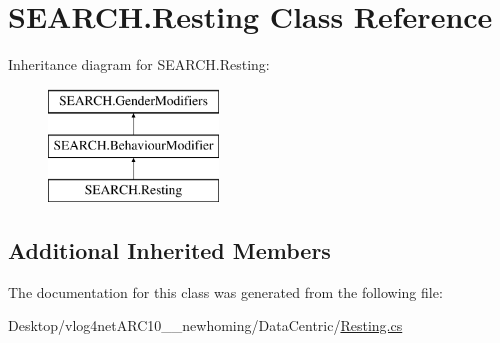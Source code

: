 \hypertarget{class_s_e_a_r_c_h_1_1_resting}{\section{S\-E\-A\-R\-C\-H.\-Resting Class Reference}
\label{class_s_e_a_r_c_h_1_1_resting}
}
Inheritance diagram for S\-E\-A\-R\-C\-H.\-Resting\-:\begin{figure}[H]
\begin{center}
\leavevmode
\includegraphics[height=3.000000cm]{class_s_e_a_r_c_h_1_1_resting}
\end{center}
\end{figure}
\subsection*{Additional Inherited Members}


The documentation for this class was generated from the following file\-:\begin{DoxyCompactItemize}
\item 
Desktop/vlog4net\-A\-R\-C10\-\_\-\_\-newhoming/\-Data\-Centric/\hyperlink{_resting_8cs}{Resting.\-cs}\end{DoxyCompactItemize}
